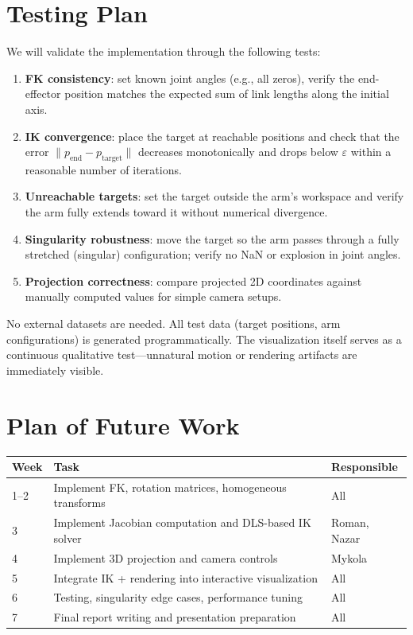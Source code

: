 \documentclass[11pt]{article}
\begin{document}
\section{Testing Plan}

We will validate the implementation through the following tests:

\begin{enumerate}[nosep]
    \item \textbf{FK consistency}: set known joint angles (e.g., all zeros), verify the end-effector position matches the expected sum of link lengths along the initial axis.
    \item \textbf{IK convergence}: place the target at reachable positions and check that the error $\|p_{\text{end}} - p_{\text{target}}\|$ decreases monotonically and drops below $\varepsilon$ within a reasonable number of iterations.
    \item \textbf{Unreachable targets}: set the target outside the arm's workspace and verify the arm fully extends toward it without numerical divergence.
    \item \textbf{Singularity robustness}: move the target so the arm passes through a fully stretched (singular) configuration; verify no NaN or explosion in joint angles.
    \item \textbf{Projection correctness}: compare projected 2D coordinates against manually computed values for simple camera setups.
\end{enumerate}

No external datasets are needed. All test data (target positions, arm configurations) is generated programmatically. The visualization itself serves as a continuous qualitative test---unnatural motion or rendering artifacts are immediately visible.

\section{Plan of Future Work}

\begin{table}[H]
\centering
\begin{tabular}{@{}lll@{}}
\toprule
\textbf{Week} & \textbf{Task} & \textbf{Responsible} \\
\midrule
1--2 & Implement FK, rotation matrices, homogeneous transforms & All \\
3 & Implement Jacobian computation and DLS-based IK solver & Roman, Nazar \\
4 & Implement 3D projection and camera controls & Mykola \\
5 & Integrate IK + rendering into interactive visualization & All \\
6 & Testing, singularity edge cases, performance tuning & All \\
7 & Final report writing and presentation preparation & All \\
\bottomrule
\end{tabular}
\end{table}
\end{document}
